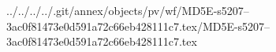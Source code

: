 ../../../../.git/annex/objects/pv/wf/MD5E-s5207--3ac0f81473e0d591a72c66eb428111c7.tex/MD5E-s5207--3ac0f81473e0d591a72c66eb428111c7.tex